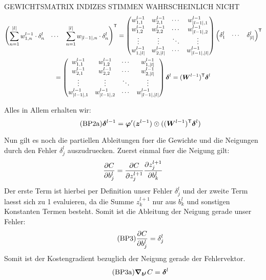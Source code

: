 \documentclass[../main]{subfiles}
\begin{document}
GEWICHTSMATRIX INDIZES STIMMEN WAHRSCHEINLICH NICHT
\begin{gather*}
  \begin{pmatrix} \displaystyle\sum_{n=1}^{|l|} w_{1,n}^{l-1} \cdot \delta_n^l & \cdots & \displaystyle\sum_{n=1}^{|l|} w_{|l-1|,n} \cdot \delta_n^l \end{pmatrix}^{\mathsf{T}} =
  \begin{pmatrix}
    w_{1,1}^{l-1} & w_{2,1}^{l-1} & \cdots & w_{|l-1|,1}^{l-1} \\
    w_{1,2}^{l-1} & w_{2,2}^{l-1} & \cdots & w_{|l-1|,2}^{l-1} \\
    \vdots & \vdots & \ddots & \vdots \\
    w_{1,|l|}^{l-1} & w_{2,|l|}^{l-1} & \cdots & w_{|l-1|,|l|}^{l-1}
  \end{pmatrix}
  \begin{pmatrix} \delta_1^l & \cdots & \delta_{|l|}^l \end{pmatrix}^{\mathsf{T}} \\=
  \begin{pmatrix}
    w_{1,1}^{l-1} & w_{1,2}^{l-1} & \cdots & w_{1,|l|}^{l-1} \\
    w_{2,1}^{l-1} & w_{2,2}^{l-1} & \cdots & w_{2,|l|}^{l-1} \\
    \vdots & \vdots & \ddots & \vdots \\
    w_{|l-1|,1}^{l-1} & w_{|l-1|,2}^{l-1} & \cdots & w_{|l-1|,|l|}^{l-1}
  \end{pmatrix}
  \bm{\delta}^l = (\bm{W}^{l-1})^{\mathsf{T}} \bm{\delta}^l
\end{gather*}

Alles in Allem erhalten wir:
\begin{equation}\tag{BP2a}
  \bm{\delta}^{l-1} = \bm{\varphi}'(\bm{z}^{l-1}) \odot ((\bm{W}^{l-1})^{\mathsf{T}} \bm{\delta}^l)
\end{equation}

\para{}

Nun gilt es noch die partiellen Ableitungen fuer die Gewichte und die Neigungen
durch den Fehler $\delta_j^l$ auszudruecken.
Zuerst einmal fuer die Neigung gilt:
\begin{equation*}
  \frac{\partial C}{\partial b_j^l} = \frac{\partial C}{\partial z_j^{l+1}} \frac{\partial z_j^{l+1}}{\partial b_k^l}
\end{equation*}
Der erste Term ist hierbei per Definition unser Fehler $\delta_j^l$ und der
zweite Term laesst sich zu 1 evaluieren, da die Summe $z_k^{l+1}$ nur aus
$b_k^l$ und sonstigen Konstanten Termen besteht.
Somit ist die Ableitung der Neigung gerade unser Fehler:
\begin{equation}\tag{BP3}
  \frac{\partial C}{\partial b_j^l} = \delta_j^l
\end{equation}
Somit ist der Kostengradient bezuglich der Neigung gerade der Fehlervektor.
\begin{equation}\tag{BP3a}
  \bm{\nabla}_{\bm{b^l}} C =  \bm{\delta}^l
\end{equation}
\end{document}
